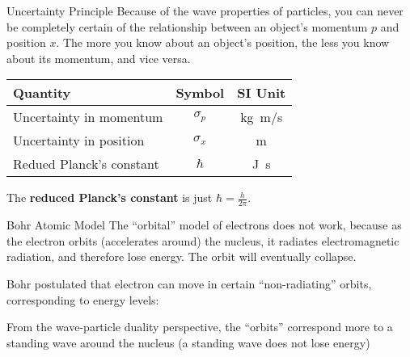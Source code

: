 \documentclass[12pt,compress,aspectratio=169]{beamer}
\newcommand{\eq}[2]{\vspace{#1}{\Large\begin{displaymath}#2\end{displaymath}}}
\begin{document}
\begin{frame}{Uncertainty Principle}
  Because of the wave properties of particles, you can never be completely
  certain of the relationship between an object's momentum $p$ and position
  $x$. The more you know about an object's position, the less you know about
  its momentum, and vice versa.

  \eq{-.2in}{
    \boxed{\sigma_p\sigma_x\geq \frac{\hbar}2}
  }
  \begin{center}
    \begin{tabular}{l|c|c}
      \rowcolor{pink}
      \textbf{Quantity} & \textbf{Symbol} & \textbf{SI Unit} \\ \hline
      Uncertainty in momentum  & $\sigma_p$ & \si{\kilo\gram.\metre/\second}\\
      Uncertainty in position  & $\sigma_x$ & \si{\metre} \\
      Redued Planck's constant & $\hbar$    & \si{\joule\second}
    \end{tabular}
  \end{center}
  The \textbf{reduced Planck's constant} is just $\hbar=\frac{h}{2\pi}$.
\end{frame}




\begin{frame}{Bohr Atomic  Model}
  The ``orbital'' model of electrons does not work, because as the electron
  orbits (accelerates around) the nucleus, it radiates electromagnetic
  radiation, and therefore lose energy. The orbit will eventually collapse.

  \vspace{.1in} Bohr postulated that electron can move in certain
  ``non-radiating'' orbits, corresponding to energy levels:

  \eq{-.1in}{
    \boxed{E_n=-\frac{k^2e^4m}{2\hbar^2}\frac{Z^2}{n^2}}
  }
  
  From the wave-particle duality perspective, the ``orbits'' correspond more to
  a standing wave around the nucleus (a standing wave does not lose energy)
\end{frame}
\end{document}
